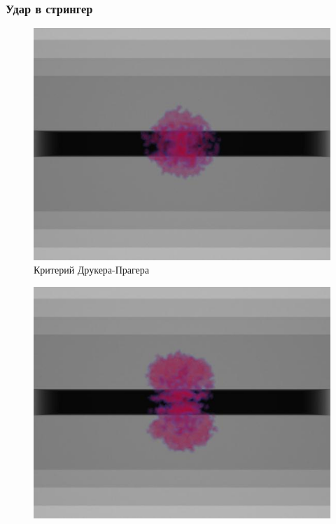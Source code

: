 \documentclass[xcolor={usenames,dvipsnames,svgnames,table}]{beamer}
\begin{document}
\begin{frame}
    \frametitle{Удар в стрингер}
    \begin{center}
        \begin{minipage}[h]{0.30\textwidth}
            \begin{figure}[h]
                \includegraphics[width=\textwidth]{png/3-stringer-panel/stringer-drucker-prager.png}
                \tiny
                \caption{Критерий Друкера-Прагера}
            \end{figure}
        \end{minipage}
        \begin{minipage}[h]{0.30\textwidth}
            \begin{figure}[h]
                \includegraphics[width=\textwidth]{png/3-stringer-panel/stringer-hashin.png}

\end{figure}
\end{minipage}
\end{center}
\end{frame}
\end{document}
